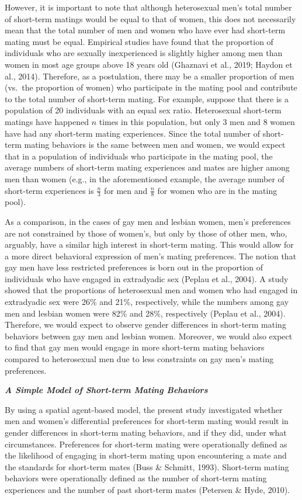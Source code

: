 \documentclass[
  12pt,
]{article}
\begin{document}
However, it is important to note that although heterosexual men's total
number of short-term matings would be equal to that of women, this does
not necessarily mean that the total number of men and women who have
ever had short-term mating must be equal. Empirical studies have found
that the proportion of individuals who are sexually inexperienced is
slightly higher among men than women in most age groups above 18 years
old (Ghaznavi et al., 2019; Haydon et al., 2014). Therefore, as a
postulation, there may be a smaller proportion of men (vs.~the
proportion of women) who participate in the mating pool and contribute
to the total number of short-term mating. For example, suppose that
there is a population of 20 individuals with an equal sex ratio.
Heterosexual short-term matings have happened \(n\) times in this
population, but only 3 men and 8 women have had any short-term mating
experiences. Since the total number of short-term mating behaviors is
the same between men and women, we would expect that in a population of
individuals who participate in the mating pool, the average numbers of
short-term mating experiences and mates are higher among men than women
(e.g., in the aforementioned example, the average number of short-term
experiences is \(\frac{n}{3}\) for men and \(\frac{n}{8}\) for women who
are in the mating pool).

As a comparison, in the cases of gay men and lesbian women, men's
preferences are not constrained by those of women's, but only by those
of other men, who, arguably, have a similar high interest in short-term
mating. This would allow for a more direct behavioral expression of
men's mating preferences. The notion that gay men have less restricted
preferences is born out in the proportion of individuals who have
engaged in extradyadic sex (Peplau et al., 2004). A study showed that
the proportions of heterosexual men and women who had engaged in
extradyadic sex were 26\% and 21\%, respectively, while the numbers
among gay men and lesbian women were 82\% and 28\%, respectively (Peplau
et al., 2004). Therefore, we would expect to observe gender differences
in short-term mating behaviors between gay men and lesbian women.
Moreover, we would also expect to find that gay men would engage in more
short-term mating behaviors compared to heterosexual men due to less
constraints on gay men's mating preferences.

\textbf{\emph{A Simple Model of Short-term Mating Behaviors}}

By using a spatial agent-based model, the present study investigated
whether men and women's differential preferences for short-term mating
would result in gender differences in short-term mating behaviors, and
if they did, under what circumstances. Preferences for short-term mating
were operationally defined as the likelihood of engaging in short-term
mating upon encountering a mate and the standards for short-term mates
(Buss \& Schmitt, 1993). Short-term mating behaviors were operationally
defined as the number of short-term mating experiences and the number of
past short-term mates (Petersen \& Hyde, 2010).
\end{document}

